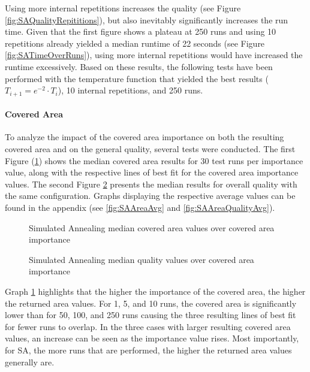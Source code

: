 Using more internal repetitions increases the quality (see Figure \ref{fig:SAQualityRepititions}), but also inevitably significantly increases the run time.
Given that the first figure shows a plateau at 250 runs and using 10 repetitions already yielded a median runtime of 22 seconds (see Figure \ref{fig:SATimeOverRuns}), using more internal repetitions would have increased the runtime excessively.
Based on these results, the following tests have been performed with the temperature function that yielded the best results ($T_{i+1} = e^{-2} \cdot T_i$), 10 internal repetitions, and 250 runs.


\paragraph{Covered Area}

To analyze the impact of the covered area importance on both the resulting covered area and on the general quality, several tests were conducted.
The first Figure (\ref{fig:SAAreaMed}) shows the median covered area results for 30 test runs per importance value, along with the respective lines of best fit for the covered area importance values.
The second Figure \ref{fig:SAAreaQualityMed} presents the median results for overall quality with the same configuration.
Graphs displaying the respective average values can be found in the appendix (see \ref{fig:SAAreaAvg} and \ref{fig:SAAreaQualityAvg}).



\begin{figure}
	\centering
	
	\caption{Simulated Annealing median covered area values over covered area importance}
	\label{fig:SAAreaMed}
\end{figure}

\begin{figure}
	\centering
	
	\caption{Simulated Annealing median quality values over covered area importance}
	\label{fig:SAAreaQualityMed}
\end{figure}


Graph \ref{fig:SAAreaMed} highlights that the higher the importance of the covered area, the higher the returned area values.
For 1, 5, and 10 runs, the covered area is significantly lower than for 50, 100, and 250 runs causing the three resulting lines of best fit for fewer runs to overlap.
In the three cases with larger resulting covered area values, an increase can be seen as the importance value rises.
Most importantly, for SA, the more runs that are performed, the higher the returned area values generally are.


